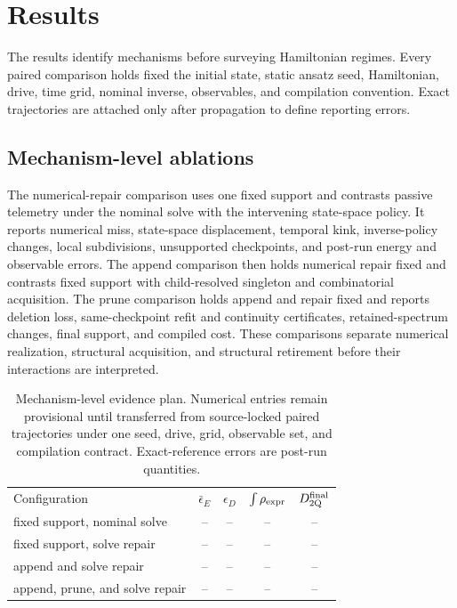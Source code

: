 \documentclass[
  reprint,
  amsmath,
  amssymb,
  aps,
  pra,
  nofootinbib,
  superscriptaddress,
  floatfix
]{revtex4-2}
\newcommand{\tentative}[1]{\textcolor{red!70!black}{#1}}
\newcommand{\twq}{\mathrm{2Q}}
\begin{document}
\section{Results}
\label{sec:results}
\label{sec:benchmarks}

The results identify mechanisms before surveying Hamiltonian regimes.  Every paired comparison holds fixed the initial state, static ansatz seed, Hamiltonian, drive, time grid, nominal inverse, observables, and compilation convention.  Exact trajectories are attached only after propagation to define reporting errors.

\subsection{Mechanism-level ablations}

The numerical-repair comparison uses one fixed support and contrasts passive telemetry under the nominal solve with the intervening state-space policy.  It reports numerical miss, state-space displacement, temporal kink, inverse-policy changes, local subdivisions, unsupported checkpoints, and post-run energy and observable errors.  The append comparison then holds numerical repair fixed and contrasts fixed support with child-resolved singleton and combinatorial acquisition.  The prune comparison holds append and repair fixed and reports deletion loss, same-checkpoint refit and continuity certificates, retained-spectrum changes, final support, and compiled cost.  These comparisons separate numerical realization, structural acquisition, and structural retirement before their interactions are interpreted.

\begin{table}[t]
\caption{Mechanism-level evidence plan.  Numerical entries remain provisional until transferred from source-locked paired trajectories under one seed, drive, grid, observable set, and compilation contract.  Exact-reference errors are post-run quantities.}
\label{tab:mechanism_ablation}
\begin{ruledtabular}
\begin{tabular}{lcccc}
Configuration & $\bar\epsilon_E$ & $\epsilon_D$ & $\int\rho_{\rm expr}$ & $D_{\twq}^{\rm final}$\\
\colrule
fixed support, nominal solve & \tentative{--} & \tentative{--} & \tentative{--} & \tentative{--}\\
fixed support, solve repair & \tentative{--} & \tentative{--} & \tentative{--} & \tentative{--}\\
append and solve repair & \tentative{--} & \tentative{--} & \tentative{--} & \tentative{--}\\
append, prune, and solve repair & \tentative{--} & \tentative{--} & \tentative{--} & \tentative{--}\\
\end{tabular}
\end{ruledtabular}
\end{table}
\end{document}

